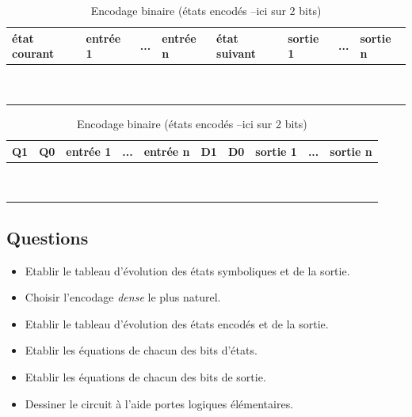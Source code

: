 \documentclass[a4paper,11pt]{article}
\begin{document}
 \begin{table}[htp]

   \centering
   \caption{Encodage symbolique (nom des états préservés)}\label{tab1}

   \begin{tabular}{|l|l|l|l||l|l|l|l|}
       \hline
       état courant & entrée 1 & ... & entrée n &  état suivant & sortie 1 & ... & sortie n \\ \hline
       ~        & ~    & ~         & ~            & ~            & ~        & ~   & ~        \\
       ~        & ~   & ~     & ~            & ~            & ~        & ~   & ~        \\
       \hline
   \end{tabular}

   \bigskip

   \caption{Encodage binaire (états encodés --ici sur 2 bits)}\label{tab2}

   \begin{tabular}{|l|l|l|l||l|l|l|l|l|l|}
     \hline
     Q1 & Q0 &  entrée 1 & ... & entrée n & D1 & D0 & sortie 1 & ... & sortie n \\ \hline
     ~        & ~  & ~  & ~  & ~  & ~  & ~  & ~        & ~   & ~        \\
     ~        & ~  & ~  & ~  & ~  & ~  & ~  & ~        & ~   & ~        \\
     \hline
   \end{tabular}

 \end{table}


\subsection*{Questions}
\begin{itemize}
  \item Etablir le tableau d'évolution des états symboliques et de la sortie.
  \item Choisir l'encodage \textit{dense} le plus naturel.
  \item Etablir le tableau d'évolution des états encodés et de la sortie.
  \item Etablir les équations de chacun des bits d'états.
  \item Etablir les équations de chacun des bits de sortie.
  \item Dessiner le circuit à l'aide portes logiques élémentaires.
\end{itemize}
\end{document}
